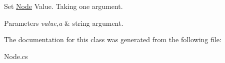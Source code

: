 Set \mbox{\hyperlink{class_animal_change_1_1_node}{Node}} Value. Taking one argument. 


\begin{DoxyParams}{Parameters}
{\em value,a} & string argument. \\
\hline
\end{DoxyParams}


The documentation for this class was generated from the following file\+:\begin{DoxyCompactItemize}
\item 
Node.\+cs\end{DoxyCompactItemize}
